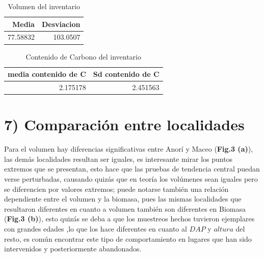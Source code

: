 \documentclass[9pt,onecolumn,twoside,]{pinp}
\begin{document}
\begin{table}

\caption{\label{tab:unnamed-chunk-29}Volumen del inventario}
\centering
\begin{tabular}[t]{r|r}
\hline
Media & Desviacion\\
\hline
77.58832 & 103.0507\\
\hline
\end{tabular}
\end{table}

\begin{table}

\caption{\label{tab:unnamed-chunk-30}Contenido de Carbono del inventario}
\centering
\begin{tabular}[t]{r|r}
\hline
media contenido de C & Sd contenido de C\\
\hline
2.175178 & 2.451563\\
\hline
\end{tabular}
\end{table}

\hypertarget{comparaciuxf3n-entre-localidades}{%
\section{7) Comparación entre
localidades}\label{comparaciuxf3n-entre-localidades}}

Para el volumen hay diferencias significativas entre Anorí y Maceo
(\textbf{Fig.3 (a)}), las demás localidades resultan ser iguales, es
interesante mirar los puntos extremos que se presentan, esto hace que
las pruebas de tendencia central puedan verse perturbadas, causando
quizás que en teoría los volúmenes sean iguales pero se diferencien por
valores extremos; puede notarse también una relación dependiente entre
el volumen y la biomasa, pues las mismas localidades que resultaron
diferentes en cuanto a volumen también son diferentes en Biomasa
(\textbf{Fig.3 (b)}), esto quizás se deba a que los muestreos hechos
tuvieron ejemplares con grandes edades ,lo que los hace diferentes en
cuanto al \(DAP\) y \(altura\) del resto, es común encontrar este tipo
de comportamiento en lugares que han sido intervenidos y posteriormente
abandonados.
\end{document}
